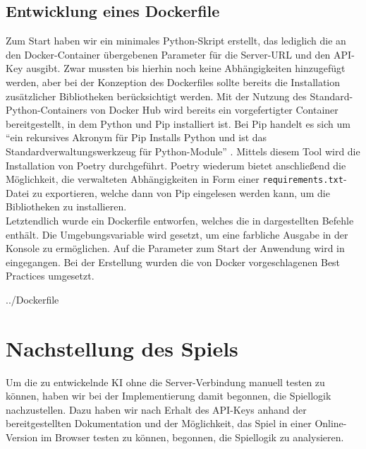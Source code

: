 \subsection{Entwicklung eines Dockerfile}
\label{subsec:dockerfile}

Zum Start haben wir ein minimales Python-Skript erstellt, das lediglich die an den Docker-Container übergebenen
Parameter für die Server-URL und den API-Key ausgibt.
Zwar mussten bis hierhin noch keine Abhängigkeiten hinzugefügt werden, aber bei der Konzeption des Dockerfiles sollte
bereits die Installation zusätzlicher Bibliotheken berücksichtigt werden.
Mit der Nutzung des Standard-Python-Containers von Docker Hub  wird bereits ein vorgefertigter
Container bereitgestellt, in dem Python und Pip installiert ist.
Bei Pip handelt es sich um "`ein rekursives Akronym für Pip Installs Python und ist das Standardverwaltungswerkzeug
für Python-Module"' .
Mittels diesem Tool wird die Installation von Poetry durchgeführt.
Poetry wiederum bietet anschließend die Möglichkeit, die verwalteten Abhängigkeiten in Form einer
\texttt{requirements.txt}-Datei zu exportieren, welche dann von Pip eingelesen werden kann, um die Bibliotheken zu
installieren. \\

Letztendlich wurde ein Dockerfile entworfen, welches die in  dargestellten Befehle enthält.
Die Umgebungsvariable  wird gesetzt, um eine farbliche Ausgabe in der Konsole zu ermöglichen.
Auf die Parameter zum Start der Anwendung wird in  eingegangen.
Bei der Erstellung wurden die von Docker vorgeschlagenen Best Practices  umgesetzt.


{../Dockerfile}

\section{Nachstellung des Spiels}
\label{sec:nachstellung-spiel}

Um die zu entwickelnde \ac{KI} ohne die Server-Verbindung manuell testen zu können, haben wir bei der Implementierung
damit begonnen, die Spiellogik nachzustellen.
Dazu haben wir nach Erhalt des API-Keys anhand der bereitgestellten Dokumentation und der Möglichkeit, das Spiel in
einer Online-Version im Browser testen zu können, begonnen, die Spiellogik zu analysieren. \\

